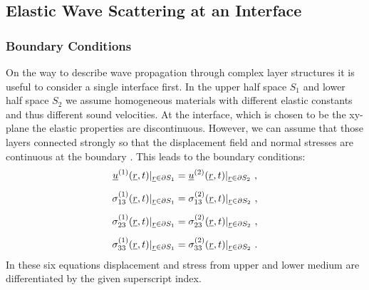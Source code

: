 
\subsection{Elastic Wave Scattering at an Interface}

\subsubsection{Boundary Conditions}
On the way to describe wave propagation through complex layer structures it is
useful to consider a single interface first. In the upper half space $S_1$ and
lower half space $S_2$
we assume homogeneous materials with different elastic constants and thus
different sound velocities. At the interface, which is chosen to be the
xy-plane the elastic properties are discontinuous. However, we can assume that
those layers connected strongly so that the displacement field and normal
stresses are continuous at the boundary \cite[182,185]{achenbach1973wave}. This
leads to the boundary conditions:
\begin{align} \label{eq:boundaryconditions}
    \uline{u}^{(1)}(\uline{r}, t)|_{\uline{r}\in\partial S_1}   & =
    \uline{u}^{(2)}(\uline{r}, t)|_{\uline{r}\in\partial S_2}    \ ,   \\[5pt]
    \sigma_{13}^{(1)}(\uline{r}, t)|_{\uline{r}\in\partial S_1} & =
    \sigma_{13}^{(2)}(\uline{r}, t)|_{\uline{r}\in\partial S_2}   \ ,  \\[5pt]
    \sigma_{23}^{(1)}(\uline{r}, t)|_{\uline{r}\in\partial S_1} & =
    \sigma_{23}^{(2)}(\uline{r}, t)|_{\uline{r}\in\partial S_2}   \ ,  \\[5pt]
    \sigma_{33}^{(1)}(\uline{r}, t)|_{\uline{r}\in\partial S_1} & =
    \sigma_{33}^{(2)}(\uline{r}, t)|_{\uline{r}\in\partial S_2} \ .
\end{align}
In these six equations displacement and stress from upper and lower medium are
differentiated by the given superscript index.


